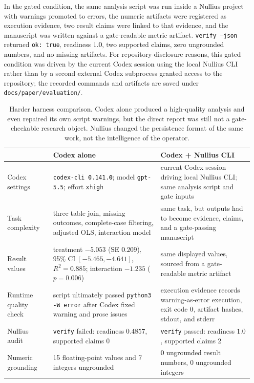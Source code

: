 \documentclass[11pt]{article}
\begin{document}
In the gated condition, the same analysis script was run inside a Nullius project with warnings promoted to errors, the numeric artifacts were registered as execution evidence, two result claims were linked to that evidence, and the manuscript was written against a gate-readable metric artifact. \texttt{verify --json} returned \texttt{ok: true}, readiness $1.0$, two supported claims, zero ungrounded numbers, and no missing artifacts. For repository-disclosure reasons, this gated condition was driven by the current Codex session using the local Nullius CLI rather than by a second external Codex subprocess granted access to the repository; the recorded commands and artifacts are saved under \texttt{docs/paper/evaluation/}.

\begin{table}[h]
\centering
\small
\begin{tabular}{@{}p{}p{}p{}@{}}
\toprule
 & \textbf{Codex alone} & \textbf{Codex + Nullius CLI} \\
\midrule
Codex settings & \texttt{codex-cli 0.141.0}; model \texttt{gpt-5.5}; effort \texttt{xhigh} & current Codex session driving local Nullius CLI; same analysis script and gate inputs \\
Task complexity & three-table join, missing outcomes, complete-case filtering, adjusted OLS, interaction model & same task, but outputs had to become evidence, claims, and a gate-passing manuscript \\
Result values & treatment $-5.053$ (SE $0.209$), 95\% CI $[-5.465,-4.641]$, $R^2=0.885$; interaction $-1.235$ ($p=0.006$) & same displayed values, sourced from a gate-readable metric artifact \\
Runtime quality check & script ultimately passed \texttt{python3 -W error} after Codex fixed warning and prose issues & execution evidence records warning-as-error execution, exit code 0, artifact hashes, stdout, and stderr \\
Nullius audit & \texttt{verify} failed: readiness $0.4857$, supported claims 0 & \texttt{verify} passed: readiness $1.0$, supported claims 2 \\
Numeric grounding & 15 floating-point values and 7 integers ungrounded & 0 ungrounded result numbers, 0 ungrounded integers \\
\bottomrule
\end{tabular}
\caption{Harder harness comparison. Codex alone produced a high-quality analysis and even repaired its own script warnings, but the direct report was still not a gate-checkable research object. Nullius changed the persistence format of the same work, not the intelligence of the operator.}
\label{tab:codexcli2}
\end{table}
\end{document}
